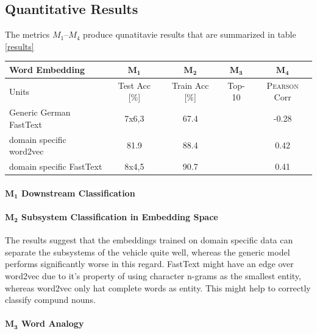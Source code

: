 \documentclass[10pt,a4paper]{article}
\begin{document}
\subsection{Quantitative Results}
	The metrics \textbf{$M_1$}--\textbf{$M_4$} produce qunatitavie results that are summarized in table \ref*{results}
	
	\begin{center}
		\begin{tabular}{|l| c| c| c|c|}
			
			\hline
			
			\textbf{Word Embedding} & $\boldsymbol{M_1}$ & $\boldsymbol{M_2}$ & $\boldsymbol{M_3}$ & $\boldsymbol{M_4}$\\ \hline
			
			Units & Test Acc [\%]& Train Acc [\%] & Top-10 & \textsc{Pearson} Corr \\ \hline
		    Generic German FastText   & 7x6,3 & 67.4 & \textbullet & -0.28\\  \hline
			
			domain specific word2vec  & 81.9 & 88.4 & \textbullet & 0.42\\  \hline
			
			domain specific FastText  & 8x4,5 &90.7 & \textbullet & 0.41\\ \hline 
		
		\end{tabular}
	\label{results}
	\end{center}

\paragraph{$\boldsymbol{M_1}$ Downstream Classification}

\paragraph{$\boldsymbol{M_2}$ Subsystem Classification in Embedding Space}
The results suggest that the embeddings trained on domain specific data can separate the subsystems of the vehicle quite well, whereas the generic model performs significantly worse in this regard. FastText might have an edge over word2vec due to it's property of using character n-grams as the smallest entity, whereas word2vec only hat complete words as entity. This might help to correctly classify compund nouns. 

\paragraph{$\boldsymbol{M_3}$ Word Analogy}
\end{document}
